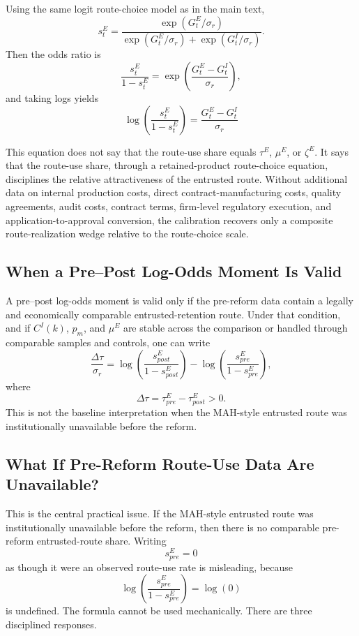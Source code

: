 \documentclass[12pt]{article}
\newcommand{\1}{\mathbf{1}}
\begin{document}
Using the same logit route-choice model as in the main text,
\[
    s_t^E
    =
    \frac{\exp(G_t^E/\sigma_r)}
    {\exp(G_t^E/\sigma_r)+\exp(G_t^I/\sigma_r)}.
\]
Then the odds ratio is
\[
    \frac{s_t^E}{1-s_t^E}
    =
    \exp\left(\frac{G_t^E-G_t^I}{\sigma_r}\right),
\]
and taking logs yields
\[
    \log\left(\frac{s_t^E}{1-s_t^E}\right)
    =
    \frac{G_t^E-G_t^I}{\sigma_r}
\]

This equation does not say that the route-use share equals $\tau^E$, $\mu^E$, or $\zeta^E$. It says that the route-use share, through a retained-product route-choice equation, disciplines the relative attractiveness of the entrusted route. Without additional data on internal production costs, direct contract-manufacturing costs, quality agreements, audit costs, contract terms, firm-level regulatory execution, and application-to-approval conversion, the calibration recovers only a composite route-realization wedge relative to the route-choice scale.

\subsection{When a Pre--Post Log-Odds Moment Is Valid}

A pre--post log-odds moment is valid only if the pre-reform data contain a legally and economically comparable entrusted-retention route. Under that condition, and if $C^I(k)$, $p_m$, and $\mu^E$ are stable across the comparison or handled through comparable samples and controls, one can write
\[
    \frac{\Delta \tau}{\sigma_r}
    =
    \log\left(\frac{s_{post}^E}{1-s_{post}^E}\right)
    -
    \log\left(\frac{s_{pre}^E}{1-s_{pre}^E}\right),
\]
where
\[
    \Delta\tau = \tau_{pre}^E-\tau_{post}^E>0.
\]
This is not the baseline interpretation when the MAH-style entrusted route was institutionally unavailable before the reform.

\subsection{What If Pre-Reform Route-Use Data Are Unavailable?}

This is the central practical issue. If the MAH-style entrusted route was institutionally unavailable before the reform, then there is no comparable pre-reform entrusted-route share. Writing
\[
    s_{pre}^E=0
\]
as though it were an observed route-use rate is misleading, because
\[
    \log\left(\frac{s_{pre}^E}{1-s_{pre}^E}\right)=\log(0)
\]
is undefined. The formula cannot be used mechanically. There are three disciplined responses.
\end{document}
